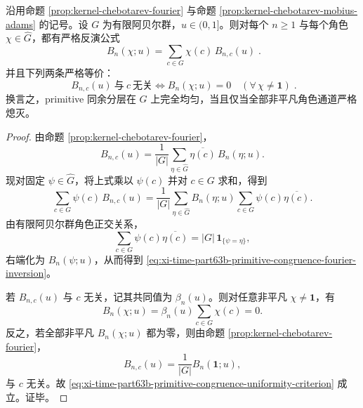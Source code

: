 \begin{theorem}\label{thm:xi-time-part63b-primitive-congruence-fourier-inversion-uniformity}
沿用命题 \ref{prop:kernel-chebotarev-fourier} 与命题 \ref{prop:kernel-chebotarev-mobius-adams} 的记号。设 \(G\) 为有限阿贝尔群，\(u\in(0,1]\)。则对每个 \(n\ge 1\) 与每个角色 \(\chi\in\widehat G\)，都有严格反演公式
\begin{equation}\label{eq:xi-time-part63b-primitive-congruence-fourier-inversion}
\boxed{\;
B_n(\chi;u)
=
\sum_{c\in G}\chi(c)\,B_{n,c}(u)\; }.
\end{equation}
并且下列两条严格等价：
\begin{equation}\label{eq:xi-time-part63b-primitive-congruence-uniformity-criterion}
\boxed{\;
B_{n,c}(u)\ \text{与}\ c\ \text{无关}
\iff
B_n(\chi;u)=0\quad(\forall\,\chi\neq \mathbf 1)\; }.
\end{equation}
换言之，primitive 同余分层在 \(G\) 上完全均匀，当且仅当全部非平凡角色通道严格熄灭。
\end{theorem}
\begin{proof}
由命题 \ref{prop:kernel-chebotarev-fourier}，
\[
B_{n,c}(u)
=
\frac{1}{|G|}
\sum_{\eta\in\widehat G}\overline{\eta(c)}\,B_n(\eta;u).
\]
现对固定 \(\psi\in\widehat G\)，将上式乘以 \(\psi(c)\) 并对 \(c\in G\) 求和，得到
\[
\sum_{c\in G}\psi(c)\,B_{n,c}(u)
=
\frac{1}{|G|}
\sum_{\eta\in\widehat G}B_n(\eta;u)
\sum_{c\in G}\psi(c)\overline{\eta(c)}.
\]
由有限阿贝尔群角色正交关系，
\[
\sum_{c\in G}\psi(c)\overline{\eta(c)}
=
|G|\,\mathbf 1_{\{\psi=\eta\}},
\]
右端化为 \(B_n(\psi;u)\)，从而得到
\eqref{eq:xi-time-part63b-primitive-congruence-fourier-inversion}。

若 \(B_{n,c}(u)\) 与 \(c\) 无关，记其共同值为 \(\beta_n(u)\)。则对任意非平凡 \(\chi\neq \mathbf 1\)，有
\[
B_n(\chi;u)
=
\beta_n(u)\sum_{c\in G}\chi(c)=0.
\]
反之，若全部非平凡 \(B_n(\chi;u)\) 都为零，则由命题
\ref{prop:kernel-chebotarev-fourier}，
\[
B_{n,c}(u)
=
\frac{1}{|G|}B_n(\mathbf 1;u),
\]
与 \(c\) 无关。故 \eqref{eq:xi-time-part63b-primitive-congruence-uniformity-criterion} 成立。证毕。
\end{proof}

